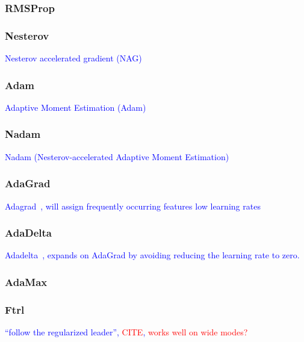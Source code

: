 \subsubsection{RMSProp}

\subsubsection{Nesterov}

\textcolor{blue}{Nesterov accelerated gradient (NAG)}

\subsubsection{Adam}

\textcolor{blue}{Adaptive Moment Estimation (Adam)~\cite{kingma2014adam}}



\subsubsection{Nadam}

\textcolor{blue}{Nadam (Nesterov-accelerated Adaptive Moment Estimation)~\cite{dozat2016incorporating}}

\subsubsection{AdaGrad}

\textcolor{blue}{Adagrad~\cite{duchi2011adaptive}, will assign frequently occurring features low learning rates}

\subsubsection{AdaDelta}

\textcolor{blue}{Adadelta~\cite{zeiler2012adadelta}, expands on AdaGrad by avoiding reducing the learning rate to zero.}

\subsubsection{AdaMax}

\subsubsection{Ftrl}

\textcolor{blue}{``follow the regularized leader'', \textcolor{red}{CITE}, \textcolor{red}{works well on wide modes?}}





